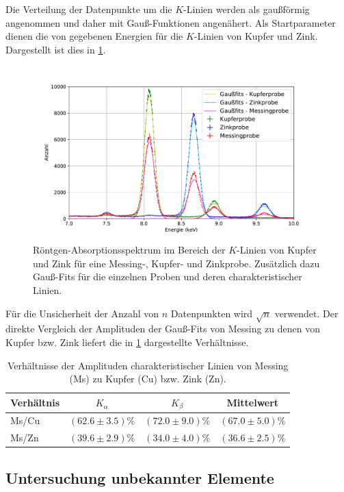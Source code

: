 	Die Verteilung der Datenpunkte um die $K$-Linien werden als gaußförmig angenommen und daher mit Gauß-Funktionen angenähert.
	Als Startparameter dienen die von \cite{brukerPTE} gegebenen Energien für die $K$-Linien von Kupfer und Zink.
	Dargestellt ist dies in \cref{fig:k-linien}.
	\begin{figure}[ht]
		\centering
		\includegraphics[width=.8\textwidth]{plots/KupferprobeK}
		\caption{Röntgen-Absorptionsspektrum im Bereich der $K$-Linien von Kupfer und Zink für eine Messing-, Kupfer- und Zinkprobe. Zusätzlich dazu Gauß-Fits für die einzelnen Proben und deren charakteristischer Linien.}
		\label{fig:k-linien}
	\end{figure}
	Für die Unsicherheit der Anzahl von $n$ Datenpunkten wird $\sqrt{n}$ verwendet.
	Der direkte Vergleich der Amplituden der Gauß-Fits von Messing zu denen von Kupfer bzw. Zink liefert die in \cref{tab:amplituden} dargestellte Verhältnisse.
	\begin{table}[H]
		\centering
		\caption{Verhältnisse der Amplituden charakteristischer Linien von Messing (Ms) zu Kupfer (Cu) bzw. Zink (Zn).}
		\begin{tabular}{l|c|c|c}
			Verhältnis & $K_\alpha$ & $K_\beta$ & Mittelwert \\ \hline
			Ms/Cu & $(62.6\pm3.5)\%$ & $(72.0\pm9.0)\%$ & $(67.0\pm5.0)\%$ \\
			Ms/Zn & $(39.6\pm2.9)\%$ & $(34.0\pm4.0)\%$ & $(36.6\pm2.5)\%$ \\
		\end{tabular}
		\label{tab:amplituden}
	\end{table}

\subsection{Untersuchung unbekannter Elemente}

